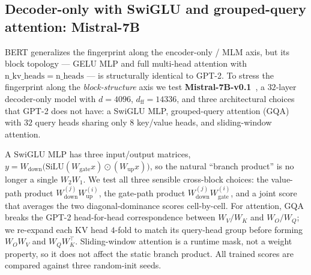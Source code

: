 \documentclass[10pt]{article}
\theoremstyle{remark}
\begin{document}
\subsection{Decoder-only with SwiGLU and grouped-query attention: Mistral-7B}\label{sec:mistral}

BERT generalizes the fingerprint along the encoder-only / MLM axis, but
its block topology --- GELU MLP and full multi-head attention with
$\mathrm{n\_kv\_heads}{=}\mathrm{n\_heads}$ --- is structurally identical
to GPT-2. To stress the fingerprint along the \emph{block-structure}
axis we test \textbf{Mistral-7B-v0.1}~\cite{jiang2023mistral7b}, a
$32$-layer decoder-only model with $d{=}4096$, $d_{\mathrm{ff}}{=}14336$,
and three architectural choices that GPT-2 does not have: a SwiGLU MLP,
grouped-query attention (GQA) with $32$ query heads sharing only $8$
key/value heads, and sliding-window attention.

A SwiGLU MLP has three input/output matrices,
$y = W_{\mathrm{down}}\bigl(\mathrm{SiLU}(W_{\mathrm{gate}} x) \odot
(W_{\mathrm{up}} x)\bigr)$, so the natural ``branch product'' is no
longer a single $W_2 W_1$. We test all three sensible cross-block
choices: the value-path product $W_{\mathrm{down}}^{(j)}
W_{\mathrm{up}}^{(i)}$, the gate-path product $W_{\mathrm{down}}^{(j)}
W_{\mathrm{gate}}^{(i)}$, and a joint score that averages the two
diagonal-dominance scores cell-by-cell. For attention, GQA breaks the
GPT-2 head-for-head correspondence between $W_V/W_K$ and
$W_O/W_Q$; we re-expand each KV head $4$-fold to match its query-head
group before forming $W_O W_V$ and $W_Q W_K^\top$. Sliding-window
attention is a runtime mask, not a weight property, so it does not
affect the static branch product. All trained scores are compared
against three random-init seeds.
\end{document}
